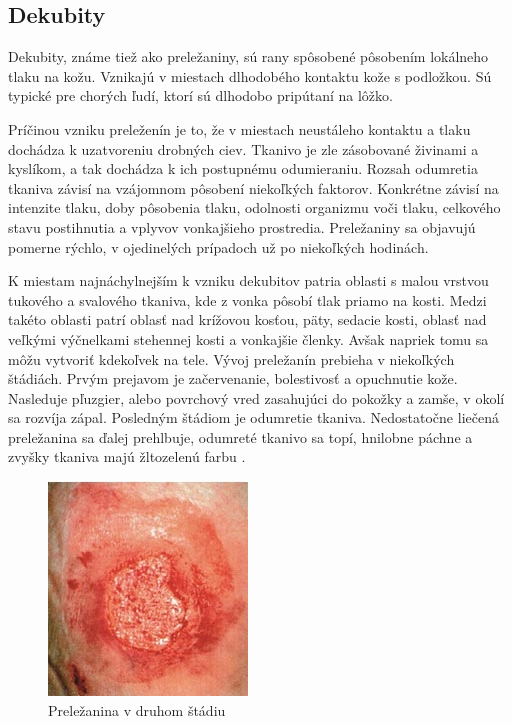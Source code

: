 \subsection{Dekubity}
Dekubity, známe tiež ako preležaniny, sú rany spôsobené pôsobením lokálneho tlaku na kožu. Vznikajú v miestach dlhodobého kontaktu kože s podložkou. Sú typické pre chorých ľudí, ktorí sú dlhodobo pripútaní na lôžko.

Príčinou vzniku preleženín je to, že v miestach neustáleho kontaktu a tlaku dochádza k uzatvoreniu drobných ciev. Tkanivo je zle zásobované živinami a kyslíkom, a tak dochádza k ich postupnému odumieraniu. Rozsah odumretia tkaniva závisí na vzájomnom pôsobení niekoľkých faktorov. Konkrétne závisí na intenzite tlaku, doby pôsobenia tlaku, odolnosti organizmu voči tlaku, celkového stavu postihnutia a vplyvov vonkajšieho prostredia. Preležaniny sa objavujú pomerne rýchlo, v ojedinelých prípadoch už po niekoľkých hodinách.

K miestam najnáchylnejším k vzniku dekubitov patria oblasti s malou vrstvou tukového a svalového tkaniva, kde z vonka pôsobí tlak priamo na kosti. Medzi takéto oblasti patrí oblasť nad krížovou kosťou, päty, sedacie kosti, oblasť nad veľkými výčnelkami stehennej kosti a vonkajšie členky. Avšak napriek tomu sa môžu vytvoriť kdekoľvek na tele. Vývoj preležanín prebieha v niekoľkých štádiách. Prvým prejavom je začervenanie, bolestivosť a opuchnutie kože. Nasleduje pľuzgier, alebo povrchový vred zasahujúci do pokožky a zamše, v okolí sa rozvíja zápal. Posledným štádiom je odumretie tkaniva. Nedostatočne liečená preležanina sa ďalej prehlbuje, odumreté tkanivo sa topí, hnilobne páchne a zvyšky tkaniva majú žltozelenú farbu \cite{pcCdSrbbhhlr5YcQ, Hlinkova2015}.
\begin{figure}[h]
  \centering
  \includegraphics[scale=1]{fig/dekubit.png}
  \caption{Preležanina v druhom štádiu \cite{Vilimovsky2015}}
  \label{fig:dekubit}
\end{figure}

